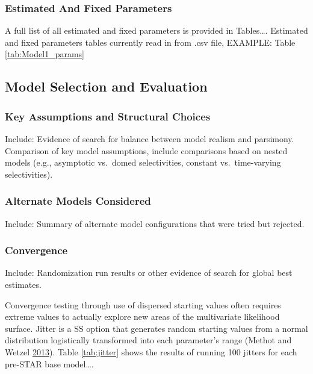 \documentclass[12pt,]{article}
\begin{document}
\subsubsection{Estimated And Fixed
Parameters}\label{estimated-and-fixed-parameters}

A full list of all estimated and fixed parameters is provided in
Tables\ldots{}. Estimated and fixed parameters tables currently read in
from .csv file, EXAMPLE: Table \ref{tab:Model1_params}

\subsection{Model Selection and
Evaluation}\label{model-selection-and-evaluation}

\subsubsection{Key Assumptions and Structural
Choices}\label{key-assumptions-and-structural-choices}

Include: Evidence of search for balance between model realism and
parsimony.\\
Comparison of key model assumptions, include comparisons based on nested
models (e.g., asymptotic vs.~domed selectivities, constant
vs.~time-varying selectivities).

\subsubsection{Alternate Models
Considered}\label{alternate-models-considered}

Include: Summary of alternate model configurations that were tried but
rejected.

\subsubsection{Convergence}\label{convergence}

Include: Randomization run results or other evidence of search for
global best estimates.

Convergence testing through use of dispersed starting values often
requires extreme values to actually explore new areas of the
multivariate likelihood surface. Jitter is a SS option that generates
random starting values from a normal distribution logistically
transformed into each parameter's range (Methot and Wetzel
\protect\hyperlink{ref-methot_stock_2013}{2013}). Table \ref{tab:jitter}
shows the results of running 100 jitters for each pre-STAR base
model\ldots{}.
\end{document}

